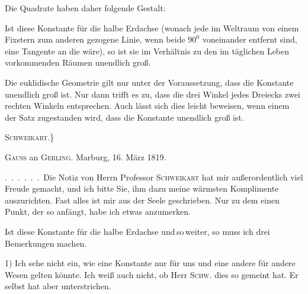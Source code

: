 Die Quadrate haben daher folgende Gestalt:

\begin{center}\end{center}

Ist diese Konstante für  die halbe Erdachse (wonach jede im Weltraum von einem Fixstern zum anderen gezogene Linie, wenn beide $90^{0}$ voneinander entfernt sind, eine Tangente an die  wäre), so ist sie im Verhältnis zu den im täglichen Leben vorkommenden Räumen unendlich groß.

Die euklidische Geometrie gilt nur unter der Voraussetzung, dass die Konstante unendlich groß ist. Nur dann trifft es zu, dass die drei Winkel jedes Dreiecks zwei rechten Winkeln entsprechen. Auch lässt sich dies leicht beweisen, wenn einem der Satz zugestanden wird, dass die Konstante unendlich groß ist.

\begin{flushright}\textsc{Schweikart.}\}\end{flushright}

\bigskip
\noindent\hrulefill
\bigskip

\begin{center}
\textsc{Gauss} an \textsc{Gerling}. Marburg, 16. März 1819.
\end{center}

.\ .\ .\ .\ .\ .\ Die Notiz von Herrn Professor \textsc{Schweikart} hat mir außerordentlich viel Freude gemacht, und ich bitte Sie, ihm dazu meine wärmsten Komplimente auszurichten. Fast alles ist mir aus der Seele geschrieben. Nur zu dem einen Punkt, der so anfängt, habe ich etwas anzumerken.

Ist diese Konstante für  die halbe Erdachse und\,so\,weiter, so muss ich drei Bemerkungen machen.

1) Ich sehe nicht ein, wie eine Konstante nur für uns und eine andere für andere Wesen gelten könnte. Ich weiß auch nicht, ob Herr \textsc{Schw.} dies so gemeint hat. Er selbst hat aber  unterstrichen.

